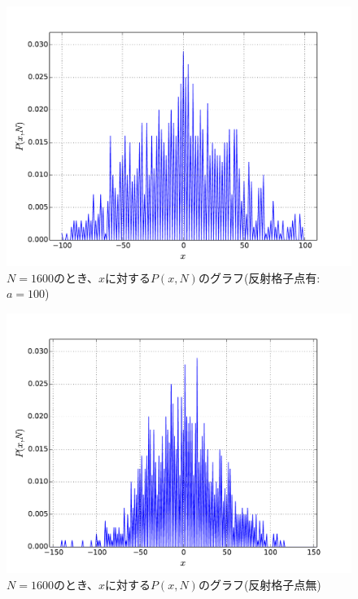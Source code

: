 \documentclass{jsarticle}
\begin{document}
\begin{enumerate}
\begin{enumerate}
                    
                    \begin{figure}[H]
                        \begin{center}
                        \includegraphics[width=12.5cm]{figure_5.pdf}
                        \caption{$N=1600$のとき、$x$に対する$P(x,N)$のグラフ(反射格子点有:$a=100$)}
                        \label{fig:5}
                    \end{center}
                    \end{figure}
                    
                    
                    \begin{figure}[H]
                        \begin{center}
                        \includegraphics[width=12.5cm]{figure_6.pdf}
                        \caption{$N=1600$のとき、$x$に対する$P(x,N)$のグラフ(反射格子点無)}
                        \label{fig:6}
                    \end{center}
                    \end{figure}
                    

\end{enumerate}
\end{enumerate}
\end{document}
